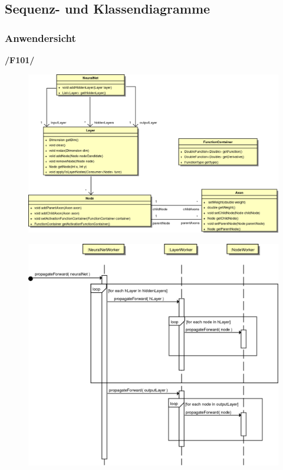 \subsection{Sequenz- und Klassendiagramme}
\subsubsection{Anwendersicht}

\textbf{/F101/}

\begin{figure}[h]
\begin{center}
\includegraphics[width=\textwidth]{Abbildungen/UML/uml_ronny/neuralNetKlassenDiagramm.png}
\end{center}
\end{figure}


\begin{figure}[H]
\begin{center}
\includegraphics[width=13cm]{Abbildungen/UML/uml_ronny/forwardPropagationSD.png}
\end{center}
\end{figure}

